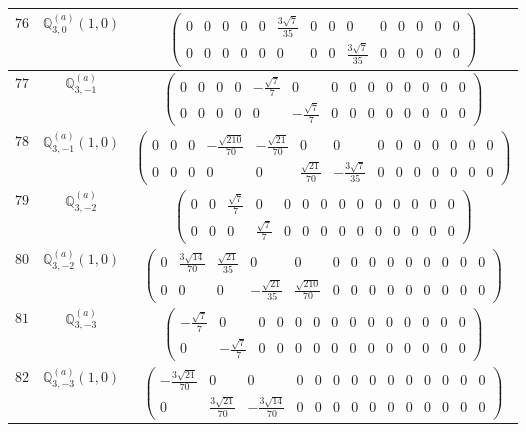 \documentclass[fleqn,8pt,landscape]{jsarticle}
\begin{document}
\begin{center}
\begin{longtable}{ccc}
$ 76 $ & $ \mathbb{Q}_{3,0}^{(a)}(1,0) $ & $ \begin{pmatrix} 0 & 0 & 0 & 0 & 0 & \frac{3 \sqrt{7}}{35} & 0 & 0 & 0 & 0 & 0 & 0 & 0 & 0 \\ 0 & 0 & 0 & 0 & 0 & 0 & 0 & 0 & \frac{3 \sqrt{7}}{35} & 0 & 0 & 0 & 0 & 0 \end{pmatrix} $ \\ \hline
$ 77 $ & $ \mathbb{Q}_{3,-1}^{(a)} $ & $ \begin{pmatrix} 0 & 0 & 0 & 0 & - \frac{\sqrt{7}}{7} & 0 & 0 & 0 & 0 & 0 & 0 & 0 & 0 & 0 \\ 0 & 0 & 0 & 0 & 0 & - \frac{\sqrt{7}}{7} & 0 & 0 & 0 & 0 & 0 & 0 & 0 & 0 \end{pmatrix} $ \\ \hline
$ 78 $ & $ \mathbb{Q}_{3,-1}^{(a)}(1,0) $ & $ \begin{pmatrix} 0 & 0 & 0 & - \frac{\sqrt{210}}{70} & - \frac{\sqrt{21}}{70} & 0 & 0 & 0 & 0 & 0 & 0 & 0 & 0 & 0 \\ 0 & 0 & 0 & 0 & 0 & \frac{\sqrt{21}}{70} & - \frac{3 \sqrt{7}}{35} & 0 & 0 & 0 & 0 & 0 & 0 & 0 \end{pmatrix} $ \\ \hline
$ 79 $ & $ \mathbb{Q}_{3,-2}^{(a)} $ & $ \begin{pmatrix} 0 & 0 & \frac{\sqrt{7}}{7} & 0 & 0 & 0 & 0 & 0 & 0 & 0 & 0 & 0 & 0 & 0 \\ 0 & 0 & 0 & \frac{\sqrt{7}}{7} & 0 & 0 & 0 & 0 & 0 & 0 & 0 & 0 & 0 & 0 \end{pmatrix} $ \\ \hline
$ 80 $ & $ \mathbb{Q}_{3,-2}^{(a)}(1,0) $ & $ \begin{pmatrix} 0 & \frac{3 \sqrt{14}}{70} & \frac{\sqrt{21}}{35} & 0 & 0 & 0 & 0 & 0 & 0 & 0 & 0 & 0 & 0 & 0 \\ 0 & 0 & 0 & - \frac{\sqrt{21}}{35} & \frac{\sqrt{210}}{70} & 0 & 0 & 0 & 0 & 0 & 0 & 0 & 0 & 0 \end{pmatrix} $ \\ \hline
$ 81 $ & $ \mathbb{Q}_{3,-3}^{(a)} $ & $ \begin{pmatrix} - \frac{\sqrt{7}}{7} & 0 & 0 & 0 & 0 & 0 & 0 & 0 & 0 & 0 & 0 & 0 & 0 & 0 \\ 0 & - \frac{\sqrt{7}}{7} & 0 & 0 & 0 & 0 & 0 & 0 & 0 & 0 & 0 & 0 & 0 & 0 \end{pmatrix} $ \\ \hline
$ 82 $ & $ \mathbb{Q}_{3,-3}^{(a)}(1,0) $ & $ \begin{pmatrix} - \frac{3 \sqrt{21}}{70} & 0 & 0 & 0 & 0 & 0 & 0 & 0 & 0 & 0 & 0 & 0 & 0 & 0 \\ 0 & \frac{3 \sqrt{21}}{70} & - \frac{3 \sqrt{14}}{70} & 0 & 0 & 0 & 0 & 0 & 0 & 0 & 0 & 0 & 0 & 0 \end{pmatrix} $ \\ \hline

\end{longtable}
\end{center}
\end{document}
